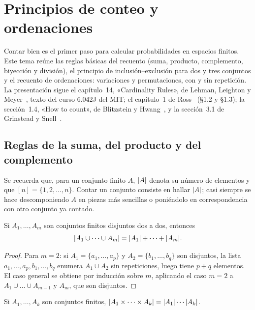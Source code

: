 \chapter{Principios de conteo y ordenaciones}
\label{tema:1}

Contar bien es el primer paso para calcular probabilidades en espacios finitos. Este tema reúne las reglas básicas del recuento (suma, producto, complemento, biyección y división), el principio de inclusión--exclusión para dos y tres conjuntos y el recuento de ordenaciones: variaciones y permutaciones, con y sin repetición. La presentación sigue el capítulo~14, «Cardinality Rules», de Lehman, Leighton y Meyer~\cite{mcs}, texto del curso 6.042J del MIT; el capítulo~1 de Ross~\cite{ross} (§1.2 y §1.3); la sección~1.4, «How to count», de Blitzstein y Hwang~\cite{bh}, y la sección~3.1 de Grinstead y Snell~\cite{gs}.

\section{Reglas de la suma, del producto y del complemento}

Se recuerda que, para un conjunto finito $A$, $\lvert A\rvert$ denota su número de elementos y que $[n]=\{1,2,\dots,n\}$. Contar un conjunto consiste en hallar $\lvert A\rvert$; casi siempre se hace descomponiendo $A$ en piezas más sencillas o poniéndolo en correspondencia con otro conjunto ya contado.

\begin{proposicion}\label{prop:t1-suma}
Si $A_1,\dots,A_m$ son conjuntos finitos disjuntos dos a dos, entonces
\[
\lvert A_1\cup\dots\cup A_m\rvert=\lvert A_1\rvert+\dots+\lvert A_m\rvert.
\]
\end{proposicion}

\begin{proof}
Para $m=2$: si $A_1=\{a_1,\dots,a_p\}$ y $A_2=\{b_1,\dots,b_q\}$ son disjuntos, la lista $a_1,\dots,a_p,b_1,\dots,b_q$ enumera $A_1\cup A_2$ sin repeticiones, luego tiene $p+q$ elementos. El caso general se obtiene por inducción sobre $m$, aplicando el caso $m=2$ a $A_1\cup\dots\cup A_{m-1}$ y $A_m$, que son disjuntos.
\end{proof}

\begin{proposicion}\label{prop:t1-producto}
Si $A_1,\dots,A_k$ son conjuntos finitos, $\lvert A_1\times\dots\times A_k\rvert=\lvert A_1\rvert\cdots\lvert A_k\rvert$.
\end{proposicion}

